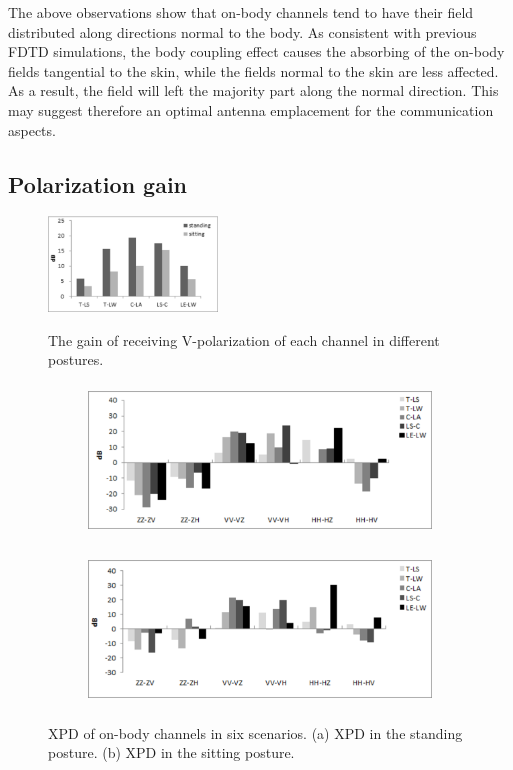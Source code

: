 \documentclass[conference]{IEEEtran}
\begin{document}
The above observations show that on-body channels tend to have their field distributed along directions normal to the body. As consistent with previous FDTD simulations, the body coupling effect causes the absorbing of the on-body fields tangential to the skin, while the fields normal to the skin are less affected. As a result, the field will left the majority part along the normal direction. This may suggest therefore an optimal antenna emplacement for the communication aspects.

\subsection{Polarization gain}
\begin{figure}[!t]
  \centering
  \includegraphics[width=0.4\textwidth]{figs/2.eps}\\
  \caption{The gain of receiving V-polarization of each channel in different postures.}
  \label{fig:2}
\end{figure}
\begin{figure}[!t]
\centering
\begin{subfigure}[t]{\textwidth}
\centering
\includegraphics[width=14cm,height=4cm]{figs/3a.eps}
\subcaption{}
\label{fig:3a}
\end{subfigure}
\begin{subfigure}[t]{\textwidth}
\centering
\includegraphics[width=14cm,height=4cm]{figs/3b.eps}
\subcaption{}
\label{fig:3b}
\end{subfigure}
\caption{XPD of on-body channels in six scenarios. (a) XPD in the standing posture. (b) XPD in the sitting posture.}
\label{fig:3}
\end{figure}
\end{document}
